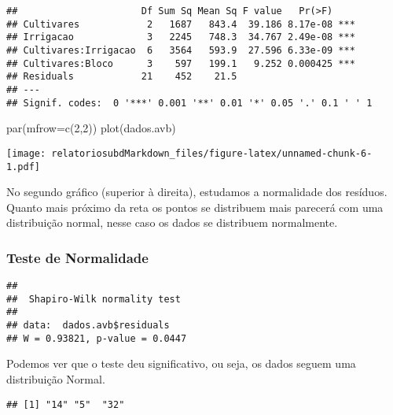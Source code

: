\documentclass[
]{article}
\newenvironment{Shaded}{\begin{snugshade}}{\end{snugshade}}
\newcommand{\AttributeTok}[1]{\textcolor[rgb]{0.77,0.63,0.00}{#1}}
\newcommand{\DecValTok}[1]{\textcolor[rgb]{0.00,0.00,0.81}{#1}}
\newcommand{\FunctionTok}[1]{\textcolor[rgb]{0.00,0.00,0.00}{#1}}
\newcommand{\NormalTok}[1]{#1}
\newcommand{\SpecialCharTok}[1]{\textcolor[rgb]{0.00,0.00,0.00}{#1}}
\begin{document}
\begin{verbatim}
##                      Df Sum Sq Mean Sq F value   Pr(>F)    
## Cultivares            2   1687   843.4  39.186 8.17e-08 ***
## Irrigacao             3   2245   748.3  34.767 2.49e-08 ***
## Cultivares:Irrigacao  6   3564   593.9  27.596 6.33e-09 ***
## Cultivares:Bloco      3    597   199.1   9.252 0.000425 ***
## Residuals            21    452    21.5                     
## ---
## Signif. codes:  0 '***' 0.001 '**' 0.01 '*' 0.05 '.' 0.1 ' ' 1
\end{verbatim}

\begin{Shaded}
\begin{Highlighting}[]
\FunctionTok{par}\NormalTok{(}\AttributeTok{mfrow=}\FunctionTok{c}\NormalTok{(}\DecValTok{2}\NormalTok{,}\DecValTok{2}\NormalTok{))}
\FunctionTok{plot}\NormalTok{(dados.avb)}
\end{Highlighting}
\end{Shaded}

\texttt{[image: relatoriosubdMarkdown\_files/figure-latex/unnamed-chunk-6-1.pdf]}

No segundo gráfico (superior à direita), estudamos a normalidade dos
resíduos. Quanto mais próximo da reta os pontos se distribuem mais
parecerá com uma distribuição normal, nesse caso os dados se distribuem
normalmente.

\hypertarget{teste-de-normalidade}{%
\subsubsection{Teste de Normalidade}\label{teste-de-normalidade}}

\begin{Shaded}
\end{Shaded}

\begin{verbatim}
## 
##  Shapiro-Wilk normality test
## 
## data:  dados.avb$residuals
## W = 0.93821, p-value = 0.0447
\end{verbatim}

Podemos ver que o teste deu significativo, ou seja, os dados seguem uma
distribuição Normal.

\begin{verbatim}
## [1] "14" "5"  "32"
\end{verbatim}
\end{document}
